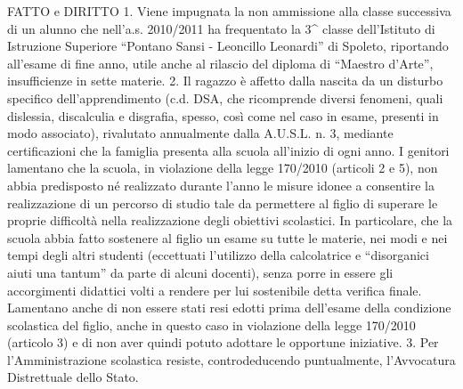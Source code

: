 FATTO e DIRITTO
1. Viene impugnata la non ammissione alla classe successiva di un alunno che nell’a.s. 2010/2011 ha frequentato la 3^ classe dell’Istituto di Istruzione Superiore “Pontano Sansi - Leoncillo Leonardi” di Spoleto, riportando all’esame di fine anno, utile anche al rilascio del diploma di “Maestro d’Arte”, insufficienze in sette materie.
2. Il ragazzo è affetto dalla nascita da un disturbo specifico dell’apprendimento (c.d. DSA, che ricomprende diversi fenomeni, quali dislessia, discalculia e disgrafia, spesso, così come nel caso in esame, presenti in modo associato), rivalutato annualmente dalla A.U.S.L. n. 3, mediante certificazioni che la famiglia presenta alla scuola all’inizio di ogni anno.
I genitori lamentano che la scuola, in violazione della legge 170/2010 (articoli 2 e 5), non abbia predisposto né realizzato durante l’anno le misure idonee a consentire la realizzazione di un percorso di studio tale da permettere al figlio di superare le proprie difficoltà nella realizzazione degli obiettivi scolastici. In particolare, che la scuola abbia fatto sostenere al figlio un esame su tutte le materie, nei modi e nei tempi degli altri studenti (eccettuati l’utilizzo della calcolatrice e “disorganici aiuti una tantum” da parte di alcuni docenti), senza porre in essere gli accorgimenti didattici volti a rendere per lui sostenibile detta verifica finale.
Lamentano anche di non essere stati resi edotti prima dell’esame della condizione scolastica del figlio, anche in questo caso in violazione della legge 170/2010 (articolo 3) e di non aver quindi potuto adottare le opportune iniziative.
3. Per l’Amministrazione scolastica resiste, controdeducendo puntualmente, l’Avvocatura Distrettuale dello Stato.
